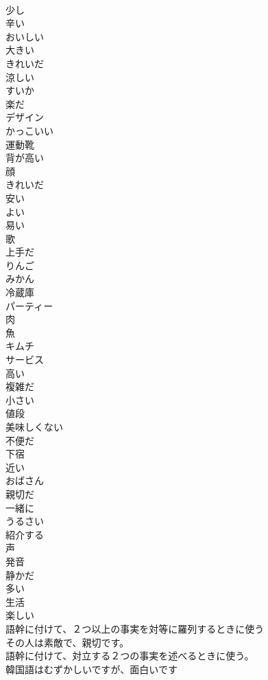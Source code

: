 \documentclass[8pt]{extreport}
\begin{document}
\begin{CJK}{UTF8}{min}
\\	少し
\\	辛い
\\	おいしい
\\	大きい
\\	きれいだ 
\\	涼しい
\\	すいか
\\	楽だ
\\	デザイン
\\	かっこいい
\\	運動靴
\\	背が高い
\\	顔
\\	きれいだ
\\	安い
\\	よい
\\	易い
\\	歌
\\	上手だ
\\	りんご
\\	みかん
\\	冷蔵庫
\\	パーティー
\\	肉
\\	魚
\\	キムチ
\\	サービス
\\	高い
\\	複雑だ
\\	小さい
\\	値段
\\	美味しくない
\\	不便だ
\\	下宿
\\	近い
\\	おばさん
\\	親切だ
\\	一緒に
\\	うるさい
\\	紹介する
\\	声
\\	発音
\\	静かだ
\\	多い
\\	生活
\\	楽しい
\\	語幹に付けて、２つ以上の事実を対等に羅列するときに使う	
\\	その人は素敵で、親切です。
\\	語幹に付けて、対立する２つの事実を述べるときに使う。	
\\	韓国語はむずかしいですが、面白いです

\end{CJK}
\end{document}

